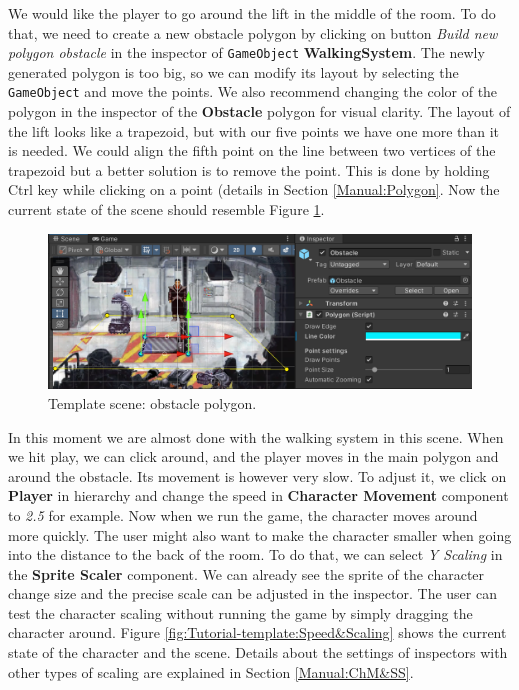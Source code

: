We would like the player to go around the lift in the middle of the room. To do that, we need to create a new obstacle polygon by clicking on button \textit{Build new polygon obstacle} in the inspector of \verb|GameObject| \textbf{WalkingSystem}. The newly generated polygon is too big, so we can modify its layout by selecting the \verb|GameObject| and move the points. We also recommend changing the color of the polygon in the inspector of the \textbf{Obstacle} polygon for visual clarity. The layout of the lift looks like a trapezoid, but with our five points we have one more than it is needed. We could align the fifth point on the line between two vertices of the trapezoid but a better solution is to remove the point. This is done by holding Ctrl key while clicking on a point (details in Section \ref{Manual:Polygon}. Now the current state of the scene should resemble Figure \ref{fig:Tutorial-template:obstacle}.

\begin{figure}[H]
\centering
\includegraphics[width=1\linewidth]{img/User doc/image_2025-07-08_110642921.png}
\caption{Template scene: obstacle polygon.}
\label{fig:Tutorial-template:obstacle}
\end{figure}

In this moment we are almost done with the walking system in this scene. When we hit play, we can click around, and the player moves in the main polygon and around the obstacle. Its movement is however very slow. To adjust it, we click on \textbf{Player} in hierarchy and change the speed in \textbf{Character Movement} component to \textit{2.5} for example. Now when we run the game, the character moves around more quickly. The user might also want to make the character smaller when going into the distance to the back of the room. To do that, we can select \textit{Y Scaling} in the \textbf{Sprite Scaler} component. We can already see the sprite of the character change size and the precise scale can be adjusted in the inspector. The user can test the character scaling without running the game by simply dragging the character around. Figure \ref{fig:Tutorial-template:Speed&Scaling} shows the current state of the character and the scene. Details about the settings of inspectors with other types of scaling are explained in Section \ref{Manual:ChM&SS}.


